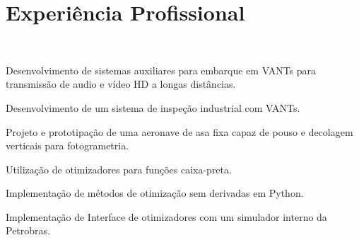 \documentclass[A4]{deedy-resume} %
\begin{document}
\begin{minipage}[t]{0.66\textwidth} %



\section{Experiência Profissional}

\\
\vspace{\topsep}
\begin{tightitemize}
 \item Desenvolvimento de sistemas auxiliares para embarque em VANTs para transmissão de audio e vídeo HD a longas distâncias.
 \item Desenvolvimento de um sistema de inspeção industrial com VANTs.
 \item Projeto e prototipação de uma aeronave de asa fixa capaz de pouso e decolagem verticais para fotogrametria.
\end{tightitemize}
\sectionspace %

\begin{tightitemize}
 \item Utilização de otimizadores para funções caixa-preta.
 \item Implementação de métodos de otimização sem derivadas em Python.
 \item Implementação de Interface de otimizadores com um simulador interno da Petrobras.

\end{tightitemize}

\sectionspace %



\end{minipage}
\end{document}
